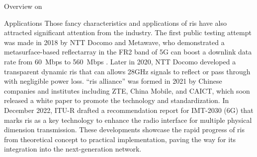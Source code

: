 \begin{section}{Overview on }
\begin{subsection}{Applications}
		Those fancy characteristics and applications of \gls{ris} have also attracted significant attention from the industry.
		The first public testing attempt was made in 2018 by NTT Docomo and Metawave, who demonstrated a metasurface-based reflectarray in the FR2 band of 5G can boost a downlink data rate from \qty{60}{Mbps} to \qty{560}{Mbps} \cite{Liu2022b}.
		Later in 2020, NTT Docomo developed a transparent dynamic \gls{ris} that can allows 28GHz signals to reflect or pass through with negligible power loss.
		``\gls{ris} alliance'' was formed in 2021 by Chinese companies and institutes including ZTE, China Mobile, and CAICT, which soon released a white paper \cite{Rista2023} to promote the technology and standardization.
		In December 2022, ITU-R drafted a recommendation report for IMT-2030 (6G) \cite{Itu2022} that marks \gls{ris} as a key technology to enhance the radio interface for multiple physical dimension transmission.
		These developments showcase the rapid progress of \gls{ris} from theoretical concept to practical implementation, paving the way for its integration into the next-generation network.
	\end{subsection}
\end{section}

